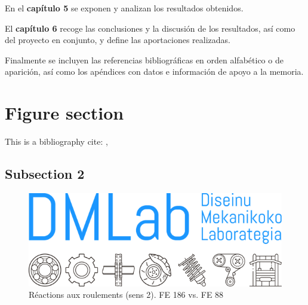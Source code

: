 En el \textbf{capítulo 5} se exponen y analizan los resultados obtenidos.

El \textbf{capítulo 6} recoge las conclusiones y la discusión de los resultados, así como del proyecto en conjunto, y define las aportaciones realizadas.

Finalmente se incluyen las referencias bibliográficas en orden alfabético o de aparición, así como los apéndices con datos e información de apoyo a la memoria.

\section{Figure section}

\blindtext
\blindtext
This is a bibliography cite: \cite{Silvers2010ASplines}, \cite{Chander1983AbnormalStudy}

\blindtext
\blindtext
\subsection{Subsection 2}
\blindtext
\begin{figure}[!htb]\centering	
\includegraphics[width=0.69\linewidth]{Figures/Logo_DMLab2.png}
    \caption{Réactions aux roulements (sens 2). FE 186 vs. FE 88}
    \label{reac_FE88}
\end{figure} 
%
%







